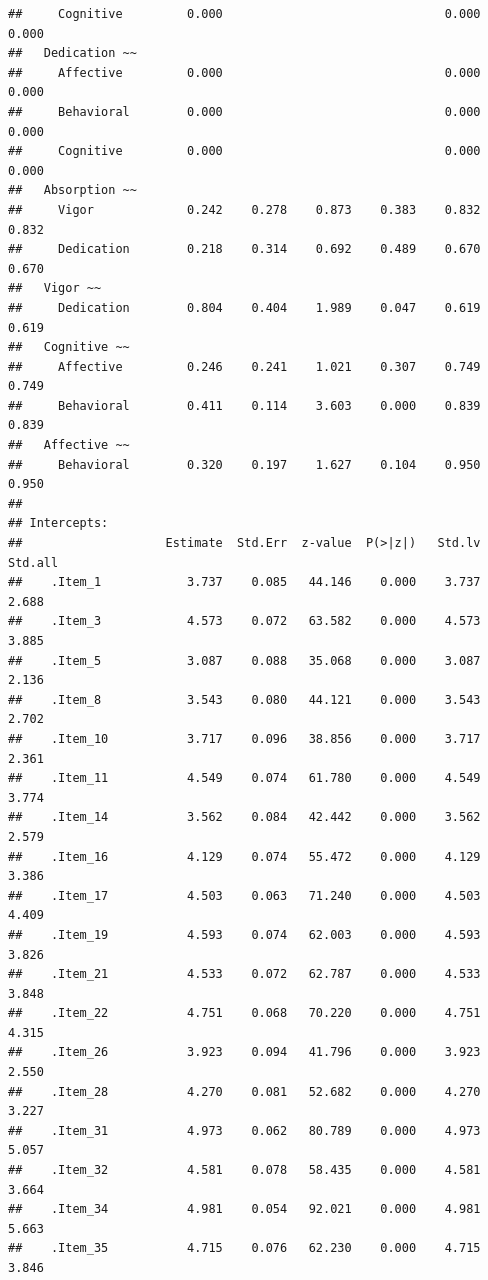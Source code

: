 \documentclass[
  english,
  man]{apa6}
\begin{document}
\begin{verbatim}
##     Cognitive         0.000                               0.000    0.000
##   Dedication ~~                                                         
##     Affective         0.000                               0.000    0.000
##     Behavioral        0.000                               0.000    0.000
##     Cognitive         0.000                               0.000    0.000
##   Absorption ~~                                                         
##     Vigor             0.242    0.278    0.873    0.383    0.832    0.832
##     Dedication        0.218    0.314    0.692    0.489    0.670    0.670
##   Vigor ~~                                                              
##     Dedication        0.804    0.404    1.989    0.047    0.619    0.619
##   Cognitive ~~                                                          
##     Affective         0.246    0.241    1.021    0.307    0.749    0.749
##     Behavioral        0.411    0.114    3.603    0.000    0.839    0.839
##   Affective ~~                                                          
##     Behavioral        0.320    0.197    1.627    0.104    0.950    0.950
## 
## Intercepts:
##                    Estimate  Std.Err  z-value  P(>|z|)   Std.lv  Std.all
##    .Item_1            3.737    0.085   44.146    0.000    3.737    2.688
##    .Item_3            4.573    0.072   63.582    0.000    4.573    3.885
##    .Item_5            3.087    0.088   35.068    0.000    3.087    2.136
##    .Item_8            3.543    0.080   44.121    0.000    3.543    2.702
##    .Item_10           3.717    0.096   38.856    0.000    3.717    2.361
##    .Item_11           4.549    0.074   61.780    0.000    4.549    3.774
##    .Item_14           3.562    0.084   42.442    0.000    3.562    2.579
##    .Item_16           4.129    0.074   55.472    0.000    4.129    3.386
##    .Item_17           4.503    0.063   71.240    0.000    4.503    4.409
##    .Item_19           4.593    0.074   62.003    0.000    4.593    3.826
##    .Item_21           4.533    0.072   62.787    0.000    4.533    3.848
##    .Item_22           4.751    0.068   70.220    0.000    4.751    4.315
##    .Item_26           3.923    0.094   41.796    0.000    3.923    2.550
##    .Item_28           4.270    0.081   52.682    0.000    4.270    3.227
##    .Item_31           4.973    0.062   80.789    0.000    4.973    5.057
##    .Item_32           4.581    0.078   58.435    0.000    4.581    3.664
##    .Item_34           4.981    0.054   92.021    0.000    4.981    5.663
##    .Item_35           4.715    0.076   62.230    0.000    4.715    3.846

\end{verbatim}
\end{document}
